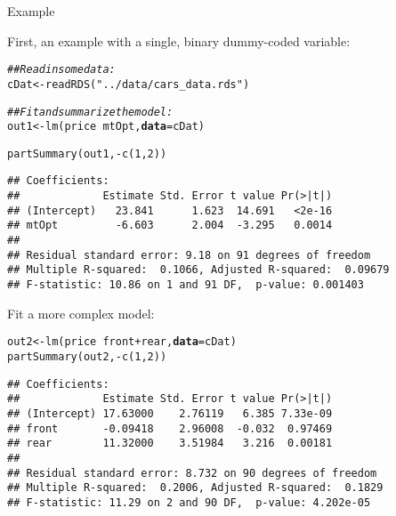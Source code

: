 \documentclass{beamer}\usepackage[]{graphicx}\usepackage[]{color}
\makeatletter
\newcommand{\hlnum}[1]{\textcolor[rgb]{0.69,0.494,0}{#1}}%
\newcommand{\hlstr}[1]{\textcolor[rgb]{0.749,0.012,0.012}{#1}}%
\newcommand{\hlcom}[1]{\textcolor[rgb]{0.514,0.506,0.514}{\textit{#1}}}%
\newcommand{\hlopt}[1]{\textcolor[rgb]{0,0,0}{#1}}%
\newcommand{\hlstd}[1]{\textcolor[rgb]{0,0,0}{#1}}%
\newcommand{\hlkwb}[1]{\textcolor[rgb]{0,0.341,0.682}{#1}}%
\newcommand{\hlkwc}[1]{\textcolor[rgb]{0,0,0}{\textbf{#1}}}%
\newcommand{\hlkwd}[1]{\textcolor[rgb]{0.004,0.004,0.506}{#1}}%
\newenvironment{kframe}{%
 \def\at@end@of@kframe{}%
 \ifinner\ifhmode%
  \def\at@end@of@kframe{\end{minipage}}%
  \begin{minipage}{\columnwidth}%
 \fi\fi%
 \def\FrameCommand##1{\hskip\@totalleftmargin \hskip-\fboxsep
 \colorbox{shadecolor}{##1}\hskip-\fboxsep
     \hskip-\linewidth \hskip-\@totalleftmargin \hskip\columnwidth}%
 \MakeFramed {\advance\hsize-\width
   \@totalleftmargin\z@ \linewidth\hsize
   \@setminipage}}%
 {\par\unskip\endMakeFramed%
 \at@end@of@kframe}
\newenvironment{knitrout}{}{} %
\makeatother
\begin{document}
\begin{frame}{Example}
  
  First, an example with a single, binary dummy-coded variable:

\begin{knitrout}\footnotesize
{}\color{fgcolor}\begin{kframe}
\begin{alltt}
\hlcom{## Read in some data:}
\hlstd{cDat} \hlkwb{<-} \hlkwd{readRDS}\hlstd{(}\hlstr{"../data/cars_data.rds"}\hlstd{)}

\hlcom{## Fit and summarize the model:}
\hlstd{out1} \hlkwb{<-} \hlkwd{lm}\hlstd{(price} \hlopt{~} \hlstd{mtOpt,} \hlkwc{data} \hlstd{= cDat)}
\end{alltt}
\end{kframe}
\end{knitrout}

\pagebreak

\begin{knitrout}\footnotesize
{}\color{fgcolor}\begin{kframe}
\begin{alltt}
\hlkwd{partSummary}\hlstd{(out1,} \hlopt{-}\hlkwd{c}\hlstd{(}\hlnum{1}\hlstd{,} \hlnum{2}\hlstd{))}
\end{alltt}
\begin{verbatim}
## Coefficients:
##             Estimate Std. Error t value Pr(>|t|)
## (Intercept)   23.841      1.623  14.691   <2e-16
## mtOpt         -6.603      2.004  -3.295   0.0014
## 
## Residual standard error: 9.18 on 91 degrees of freedom
## Multiple R-squared:  0.1066,	Adjusted R-squared:  0.09679 
## F-statistic: 10.86 on 1 and 91 DF,  p-value: 0.001403
\end{verbatim}
\end{kframe}
\end{knitrout}

\pagebreak
  
Fit a more complex model:

\begin{knitrout}\footnotesize
{}\color{fgcolor}\begin{kframe}
\begin{alltt}
\hlstd{out2} \hlkwb{<-} \hlkwd{lm}\hlstd{(price} \hlopt{~} \hlstd{front} \hlopt{+} \hlstd{rear,} \hlkwc{data} \hlstd{= cDat)}
\hlkwd{partSummary}\hlstd{(out2,} \hlopt{-}\hlkwd{c}\hlstd{(}\hlnum{1}\hlstd{,} \hlnum{2}\hlstd{))}
\end{alltt}
\begin{verbatim}
## Coefficients:
##             Estimate Std. Error t value Pr(>|t|)
## (Intercept) 17.63000    2.76119   6.385 7.33e-09
## front       -0.09418    2.96008  -0.032  0.97469
## rear        11.32000    3.51984   3.216  0.00181
## 
## Residual standard error: 8.732 on 90 degrees of freedom
## Multiple R-squared:  0.2006,	Adjusted R-squared:  0.1829 
## F-statistic: 11.29 on 2 and 90 DF,  p-value: 4.202e-05
\end{verbatim}
\end{kframe}
\end{knitrout}


\end{frame}
\end{document}
